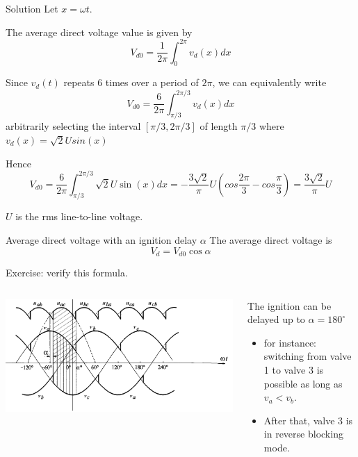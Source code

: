\begin{frame}[allowframebreaks]{Solution}
    Let $x = \omega t$.

    The average direct voltage value is given by $$ V_{d0}=\frac{1}{2\pi}\int_{0}^{2\pi} v_d(x) dx$$

    Since $v_d(t)$ repeats 6 times over a period of $2 \pi$, we can equivalently write 
    $$ V_{d0}=\frac{6}{2\pi}\int_{\pi/3}^{2\pi/3} v_d(x) dx$$
    arbitrarily selecting the interval $[{\pi/3}, {2\pi/3}]$ of length $\pi/3$ where $v_d(x) = \sqrt{2} U sin(x)$

    Hence $$ V_{d0}=\frac{6}{2\pi}\int_{\pi/3}^{2\pi/3} \sqrt{2} U \sin(x) dx = -\frac{3\sqrt{2}}{\pi} U \left(cos \frac{2\pi}{3} - cos \frac{\pi}{3}\right) = \frac{3\sqrt{2}}{\pi} U$$

    $U$ is the rms line-to-line voltage.

\end{frame}


\begin{frame}
\begin{block}{Average direct voltage with an ignition delay $\alpha$}
The {average direct voltage} is $$V_{d} = V_{d0} \cos \alpha$$

Exercise: verify this formula. 
\end{block}

\begin{columns}
\begin{column}{0.5\linewidth}
    \begin{center}
    \includegraphics[width=\linewidth]{images/6pulse-alpha1.png}
\end{center}
\end{column}
\begin{column}{0.5\linewidth}
The ignition can be delayed up to $\alpha=180^\circ$
\begin{itemize}
    \item for instance: switching from valve 1 to valve 3 is possible as long as $v_a < v_b$.
    \item After that, valve 3 is in reverse blocking mode.
\end{itemize}
\end{column}
\end{columns}
\end{frame}

